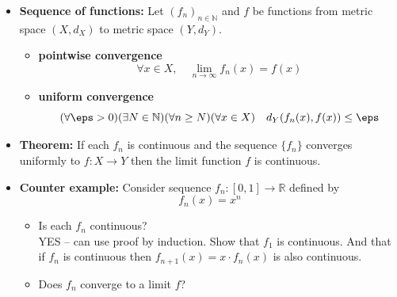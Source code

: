 \documentclass[11pt,twoside]{report}
\newcommand{\bbN}{{\mathbb{N}}}
\newcommand{\bbR}{{\mathbb{R}}}
\begin{document}
\begin{itemize}
\begin{itemize}
\begin{itemize}
\end{itemize}


\begin{center}

\end{center}




\item \textbf{Sequence of functions:} Let $(f_n)_{n \in \bbN}$  and $f$ be functions from metric space $(X, d_X)$ to metric space $(Y, d_Y)$. 
\begin{itemize}
\item \textbf{pointwise convergence} 
\[
\forall x \in X, \quad \lim_{n \to \infty} f_n(x) = f(x) 
\]

\item \textbf{uniform convergence} 
\[
(\forall \eps > 0 )(\exists N \in \bbN)  (\forall n \ge N) ( \forall x \in X) \quad d_Y(f_n(x), f(x)) \le \eps 
\]

\end{itemize}



\item \textbf{Theorem:} If each $f_n$ is continuous and the sequence $\{f_n\}$ converges uniformly to $f \colon X \to Y$ then the limit function $f$ is continuous. 



\item \textbf{Counter example:} Consider sequence $f_n \colon [0,1] \to \bbR$ defined by 
\[
f_n(x) = x^n 
\] 
\begin{itemize}
\item Is each $f_n$ continuous? \\

YES --  can use proof by induction. Show that $f_1$ is continuous. And that if $f_n$ is continuous then $f_{n+1}(x)  = x \cdot f_n(x)$ is also continuous. 

\item Does $f_n$ converge to a limit $f$? \\


\end{itemize}
\end{itemize}
\end{itemize}
\end{document}
